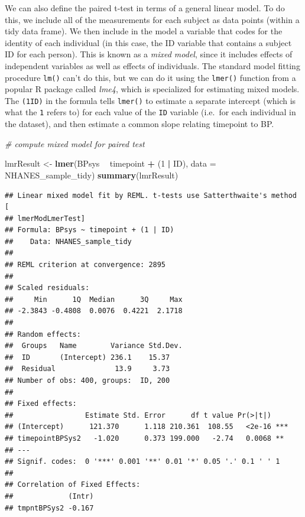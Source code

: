 \documentclass[12pt,]{book}
\newenvironment{Shaded}{\begin{snugshade}}{\end{snugshade}}
\newcommand{\CommentTok}[1]{\textcolor[rgb]{0.56,0.35,0.01}{\textit{#1}}}
\newcommand{\DataTypeTok}[1]{\textcolor[rgb]{0.13,0.29,0.53}{#1}}
\newcommand{\DecValTok}[1]{\textcolor[rgb]{0.00,0.00,0.81}{#1}}
\newcommand{\KeywordTok}[1]{\textcolor[rgb]{0.13,0.29,0.53}{\textbf{#1}}}
\newcommand{\NormalTok}[1]{#1}
\newcommand{\OperatorTok}[1]{\textcolor[rgb]{0.81,0.36,0.00}{\textbf{#1}}}
\newcommand{\StringTok}[1]{\textcolor[rgb]{0.31,0.60,0.02}{#1}}
\theoremstyle{definition}
\theoremstyle{definition}
\theoremstyle{definition}
\theoremstyle{remark}
\begin{document}
We can also define the paired t-test in terms of a general linear model. To do this, we include all of the measurements for each subject as data points (within a tidy data frame). We then include in the model a variable that codes for the identity of each individual (in this case, the ID variable that contains a subject ID for each person). This is known as a \emph{mixed model}, since it includes effects of independent variables as well as effects of individuals. The standard model fitting procedure \texttt{lm()} can't do this, but we can do it using the \texttt{lmer()} function from a popular R package called \emph{lme4}, which is specialized for estimating mixed models. The \texttt{(1\textbar{}ID)} in the formula tells \texttt{lmer()} to estimate a separate intercept (which is what the \texttt{1} refers to) for each value of the \texttt{ID} variable (i.e.~for each individual in the dataset), and then estimate a common slope relating timepoint to BP.

\begin{Shaded}
\begin{Highlighting}[]
\CommentTok{# compute mixed model for paired test}

\NormalTok{lmrResult <-}\StringTok{ }\KeywordTok{lmer}\NormalTok{(BPsys }\OperatorTok{~}\StringTok{ }\NormalTok{timepoint }\OperatorTok{+}\StringTok{ }\NormalTok{(}\DecValTok{1} \OperatorTok{|}\StringTok{ }\NormalTok{ID), }
                  \DataTypeTok{data =}\NormalTok{ NHANES_sample_tidy)}
\KeywordTok{summary}\NormalTok{(lmrResult)}
\end{Highlighting}
\end{Shaded}

\begin{verbatim}
## Linear mixed model fit by REML. t-tests use Satterthwaite's method [
## lmerModLmerTest]
## Formula: BPsys ~ timepoint + (1 | ID)
##    Data: NHANES_sample_tidy
## 
## REML criterion at convergence: 2895
## 
## Scaled residuals: 
##     Min      1Q  Median      3Q     Max 
## -2.3843 -0.4808  0.0076  0.4221  2.1718 
## 
## Random effects:
##  Groups   Name        Variance Std.Dev.
##  ID       (Intercept) 236.1    15.37   
##  Residual              13.9     3.73   
## Number of obs: 400, groups:  ID, 200
## 
## Fixed effects:
##                 Estimate Std. Error      df t value Pr(>|t|)    
## (Intercept)      121.370      1.118 210.361  108.55   <2e-16 ***
## timepointBPSys2   -1.020      0.373 199.000   -2.74   0.0068 ** 
## ---
## Signif. codes:  0 '***' 0.001 '**' 0.01 '*' 0.05 '.' 0.1 ' ' 1
## 
## Correlation of Fixed Effects:
##             (Intr)
## tmpntBPSys2 -0.167
\end{verbatim}
\end{document}
